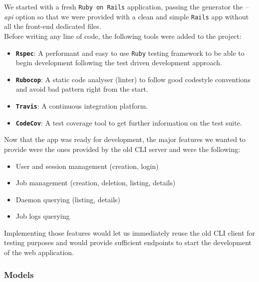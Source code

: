 \documentclass{eplmastersthesis}
\begin{document}
        We started with a fresh \texttt{Ruby on Rails} application, passing the
        generator the \textit{--api} option so that we were provided with
        a clean and simple \texttt{Rails} app without all the front-end dedicated
        files.\\

        Before writing any line of code, the following tools were added
        to the project:

        \begin{itemize}
          \item \textbf{\texttt{Rspec}}: A performant and easy to use \texttt{Ruby} testing
          framework to be able to begin development following the test
          driven development approach.
          \item \textbf{\texttt{Rubocop}}: A static code analyser (linter) to follow
          good codestyle conventions and avoid bad pattern right from the start.
          \item \textbf{\texttt{Travis}}: A continuous integration platform.
          \item \textbf{\texttt{CodeCov}}: A test coverage tool to get further
          information on the test suite.
        \end{itemize}

        Now that the app was ready for development, the major features
        we wanted to provide were the ones provided by the old CLI server and
        were the following:

        \begin{itemize}
          \item User and session management (creation, login)
          \item Job management (creation, deletion, listing, details)
          \item Daemon querying (listing, details)
          \item Job logs querying
        \end{itemize}

        Implementing those features would let us immediately reuse the old
        CLI client for testing purposes and would provide sufficient endpoints
        to start the development of the web application.\\

        \subsubsection{Models}
\end{document}
